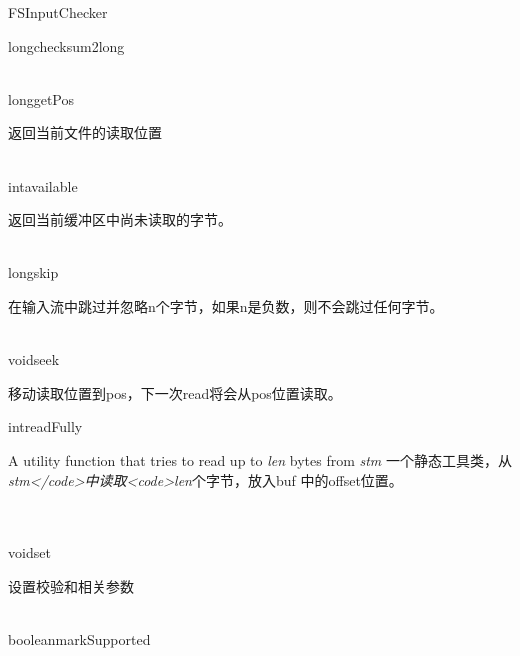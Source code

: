 \begin{XeClass}{FSInputChecker}
\begin{XeMethod}{\XePublic}{long}{checksum2long}
    \end{XeMethod}

    \begin{XeMethod}{\XePublic \\ \XeSync}{long}{getPos}
         
 返回当前文件的读取位置

    \end{XeMethod}

    \begin{XeMethod}{\XePublic \\ \XeSync}{int}{available}
         
 返回当前缓冲区中尚未读取的字节。

    \end{XeMethod}

    \begin{XeMethod}{\XePublic \\ \XeSync}{long}{skip}
         
 在输入流中跳过并忽略n个字节，如果n是负数，则不会跳过任何字节。

    \end{XeMethod}

    \begin{XeMethod}{\XePublic \\ \XeSync}{void}{seek}
         
 移动读取位置到pos，下一次read将会从pos位置读取。

    \end{XeMethod}

    \begin{XeMethod}{\XeProtected}{int}{readFully}
         
 A utility function that tries to read up to \emph{len} bytes from
 \emph{stm}
 一个静态工具类，从\emph{stm</code>中读取<code>len}个字节，放入buf
 中的offset位置。

    \end{XeMethod}

    \begin{XeMethod}{\XeFinal \\ \XeProtected \\ \XeSync}{void}{set}
         
 设置校验和相关参数

    \end{XeMethod}

    \begin{XeMethod}{\XeFinal \\ \XePublic}{boolean}{markSupported}
         

\end{XeMethod}
\end{XeClass}
